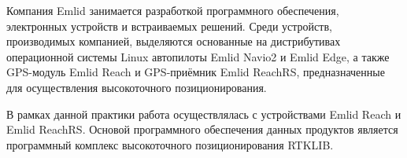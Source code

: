 \documentclass{../../scs-iam}
\begin{document}
  \pagestyle{headcenter}
  
  

  \setcounter{page}{2}
  
  
  Компания Emlid занимается разработкой программного обеспечения, электронных устройств и встраиваемых решений. Среди устройств, производимых компанией, выделяются основанные на дистрибутивах операционной системы Linux автопилоты Emlid Navio2 и Emlid Edge, а также GPS-модуль Emlid Reach и GPS-приёмник Emlid ReachRS, предназначенные для осуществления высокоточного позиционирования. \par
  
  В рамках данной практики работа осуществлялась с устройствами Emlid Reach и Emlid ReachRS. Основой программного обеспечения данных продуктов является программный комплекс высокоточного позиционирования RTKLIB.
\end{document}
